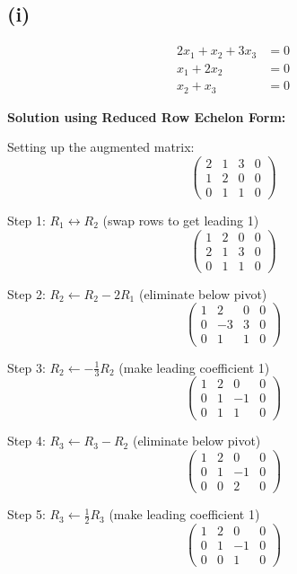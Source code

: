 \subsection*{(i)}
\begin{align*}
	2x_1 + x_2 + 3x_3 & = 0 \\
	x_1 + 2x_2        & = 0 \\
	x_2 + x_3         & = 0
\end{align*}

\textbf{Solution using Reduced Row Echelon Form:}

Setting up the augmented matrix:
\[
	\left(\begin{array}{ccc|c}
			2 & 1 & 3 & 0 \\
			1 & 2 & 0 & 0 \\
			0 & 1 & 1 & 0
		\end{array}\right)
\]

Step 1: $R_1 \leftrightarrow R_2$ (swap rows to get leading 1)
\[
	\left(\begin{array}{ccc|c}
			1 & 2 & 0 & 0 \\
			2 & 1 & 3 & 0 \\
			0 & 1 & 1 & 0
		\end{array}\right)
\]

Step 2: $R_2 \leftarrow R_2 - 2R_1$ (eliminate below pivot)
\[
	\left(\begin{array}{ccc|c}
			1 & 2  & 0 & 0 \\
			0 & -3 & 3 & 0 \\
			0 & 1  & 1 & 0
		\end{array}\right)
\]

Step 3: $R_2 \leftarrow -\frac{1}{3}R_2$ (make leading coefficient 1)
\[
	\left(\begin{array}{ccc|c}
			1 & 2 & 0  & 0 \\
			0 & 1 & -1 & 0 \\
			0 & 1 & 1  & 0
		\end{array}\right)
\]

Step 4: $R_3 \leftarrow R_3 - R_2$ (eliminate below pivot)
\[
	\left(\begin{array}{ccc|c}
			1 & 2 & 0  & 0 \\
			0 & 1 & -1 & 0 \\
			0 & 0 & 2  & 0
		\end{array}\right)
\]

Step 5: $R_3 \leftarrow \frac{1}{2}R_3$ (make leading coefficient 1)
\[
	\left(\begin{array}{ccc|c}
			1 & 2 & 0  & 0 \\
			0 & 1 & -1 & 0 \\
			0 & 0 & 1  & 0
		\end{array}\right)
\]

